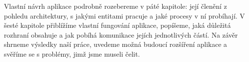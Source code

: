 Vlastní návrh aplikace podrobně rozebereme v páté kapitole: její členění z pohledu architektury, s jakými entitami pracuje a jaké procesy v ní probíhají.
V šesté kapitole přiblížíme vlastní fungování aplikace, popíšeme, jaká důležitá rozhraní obsahuje a jak pobíhá komunikace jejích jednotlivých částí.
Na závěr shrneme výsledky naší práce, uvedeme možná budoucí rozšíření aplikace a svěříme se s problémy, jimž jsme museli čelit.
